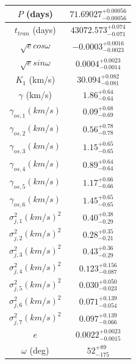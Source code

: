 \documentclass{article}
\begin{document}
\begin{table}
\centering
\begin{tabular}{| c | c |}
\hline
$P$ (days) & $71.69027^{+0.00056}_{-0.00056}$ \\
\hline
$t_{tran}$ (days) & $43072.573^{+0.074}_{-0.071}$ \\
\hline
$\sqrt{e} cos\omega$ & $-0.0003^{+0.0016}_{-0.0023}$ \\
\hline
$\sqrt{e} sin\omega$ & $0.0004^{+0.0023}_{-0.0014}$ \\
\hline
$K_1$ (km/s) & $30.094^{+0.082}_{-0.081}$ \\
\hline
$\gamma$ (km/s) & $1.86^{+0.64}_{-0.64}$ \\
\hline
$\gamma_{os,1} (km/s)$ & $0.09^{+0.68}_{-0.69}$ \\
\hline
$\gamma_{os,2} (km/s)$ & $0.56^{+0.78}_{-0.78}$ \\
\hline
$\gamma_{os,3} (km/s)$ & $1.15^{+0.65}_{-0.65}$ \\
\hline
$\gamma_{os,4} (km/s)$ & $0.89^{+0.64}_{-0.64}$ \\
\hline
$\gamma_{os,5} (km/s)$ & $1.17^{+0.66}_{-0.66}$ \\
\hline
$\gamma_{os,6} (km/s)$ & $1.45^{+0.65}_{-0.65}$ \\
\hline
$\sigma^2_{j,1} (km/s)^2$ & $0.40^{+0.38}_{-0.29}$ \\
\hline
$\sigma^2_{j,2} (km/s)^2$ & $0.28^{+0.35}_{-0.21}$ \\
\hline
$\sigma^2_{j,3} (km/s)^2$ & $0.43^{+0.36}_{-0.29}$ \\
\hline
$\sigma^2_{j,4} (km/s)^2$ & $0.123^{+0.156}_{-0.087}$ \\
\hline
$\sigma^2_{j,5} (km/s)^2$ & $0.030^{+0.050}_{-0.023}$ \\
\hline
$\sigma^2_{j,6} (km/s)^2$ & $0.071^{+0.139}_{-0.054}$ \\
\hline
$\sigma^2_{j,7} (km/s)^2$ & $0.097^{+0.139}_{-0.066}$ \\
\hline
$e$ & $0.0022^{+0.0023}_{-0.0015}$ \\
\hline
$\omega$ (deg) & $52^{+89}_{-175}$ \\
\hline
\end{tabular}
\end{table}
\end{document}
